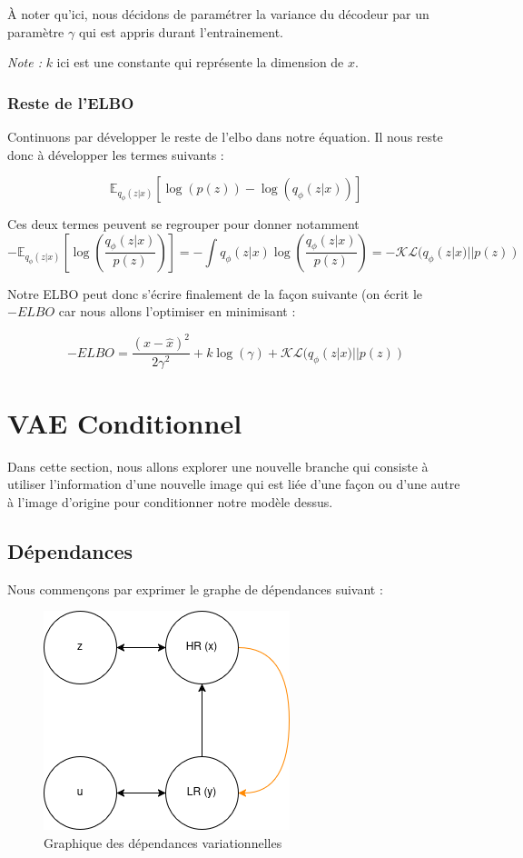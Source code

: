 \documentclass{article}
\begin{document}
À noter qu'ici, nous décidons de paramétrer la variance du décodeur par un paramètre $\gamma$ qui est appris durant l'entrainement.

\emph{Note :} $k$ ici est une constante qui représente la dimension de $x$.

\subsubsection{Reste de l'ELBO}\label{kl}

Continuons par développer le reste de l'elbo dans notre équation.
Il nous reste donc à développer les termes suivants : 

\begin{equation*}
    \mathbb{E}_{q_\phi(z|x)}[\log(p(z)) - \log(q_\phi(z|x))]
\end{equation*}

Ces deux termes peuvent se regrouper pour donner notamment 
\begin{equation*}
    - \mathbb{E}_{q_\phi(z|x)}\left[\log\left(\frac{q_\phi(z|x)}{p(z)}\right)\right] = - \int q_\phi(z|x)\log\left(\frac{q_\phi(z|x)}{p(z)}\right) = - \mathcal{KL}(q_\phi(z|x)||p(z))
\end{equation*}

Notre ELBO peut donc s'écrire finalement de la façon suivante (on écrit le $-ELBO$ car nous allons l'optimiser en minimisant :

\begin{equation}
    - ELBO = \frac{(x-\hat{x})^2}{2\gamma^2} + k\log(\gamma) + \mathcal{KL}(q_\phi(z|x)||p(z))
\end{equation}

\section{VAE Conditionnel}

Dans cette section, nous allons explorer une nouvelle branche qui consiste à utiliser l'information d'une nouvelle image qui est liée d'une façon ou d'une autre à l'image d'origine pour conditionner notre modèle dessus.
\subsection{Dépendances}
Nous commençons par exprimer le graphe de dépendances suivant :
\begin{figure}[!ht]
    \centering
    \includegraphics[width=0.5\linewidth]{img/SRVAE_deps.png}
    \caption{Graphique des dépendances variationnelles}
    \label{fig:vardeps}
\end{figure}
\end{document}
